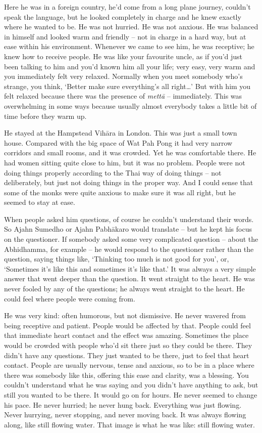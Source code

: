 Here he was in a foreign country, he'd come from a long plane journey, 
couldn't speak the language, but he looked completely in charge and he
knew exactly where he wanted to be. He was not hurried. He was not
anxious. He was balanced in himself and looked warm and friendly -- not
in charge in a hard way, but at ease within his environment. Whenever we
came to see him, he was receptive; he knew how to receive people. He was
like your favourite uncle, as if you'd just been talking to him and
you'd known him all your life; very easy, very warm and you immediately
felt very relaxed. Normally when you meet somebody who's strange, you
think, `Better make sure everything's all right\ldots{}' But with him
you felt relaxed because there was the presence of \emph{mettā} --
immediately. This was overwhelming in some ways because usually almost
everybody takes a little bit of time before they warm up.

He stayed at the Hampstead Vihāra in London. This was just a small town
house. Compared with the big space of Wat Pah Pong it had very narrow
corridors and small rooms, and it was crowded. Yet he was comfortable
there. He had women sitting quite close to him, but it was no problem. 
People were not doing things properly according to the Thai way of doing
things -- not deliberately, but just not doing things in the proper way. 
And I could sense that some of the monks were quite anxious to make sure
it was all right, but he seemed to stay at ease. 

When people asked him questions, of course he couldn't understand their
words. So Ajahn Sumedho or Ajahn Pabhākaro would translate -- but he
kept his focus on the questioner. If somebody asked some very
complicated question -- about the Abhidhamma, for example -- he
would respond to the questioner rather than the question, saying things
like, `Thinking too much is not good for you', or, `Sometimes it's like
this and sometimes it's like that.' It was always a very simple answer
that went deeper than the question. It went straight to the heart. He
was never fooled by any of the questions; he always went straight to the
heart. He could feel where people were coming from. 

He was very kind: often humorous, but not dismissive. He never wavered
from being receptive and patient. People would be affected by that. People could feel that immediate heart
contact and the effect was amazing. Sometimes the place would be crowded
with people who'd sit there just so they could be there. They didn't
have any questions. They just wanted to be there, just to feel that
heart contact. People are usually nervous, tense and anxious, so to be
in a place where there was somebody like this, offering this ease and
clarity, was a blessing. You couldn't understand what he was saying and
you didn't have anything to ask, but still you wanted to be there. It
would go on for hours. He never seemed to change his pace. He never
hurried; he never hung back. Everything was just flowing. Never
hurrying, never stopping, and never moving back. It was always flowing
along, like still flowing water. That image is what he was like: still
flowing water. 

